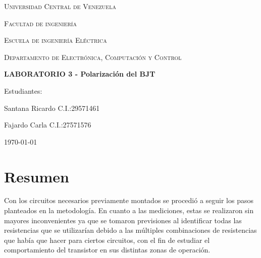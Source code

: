 \documentclass[10pt, a4paper]{article}
\begin{document}
    \begin{titlepage}
        \centering
        {\scshape\Large Universidad Central de Venezuela \par}
        {\scshape\Large Facultad de ingenier\'ia \par}
        {\scshape\Large Escuela de ingenier\'ia El\'ectrica \par}
        {\scshape\Large Departamento de Electr\'onica, Computaci\'on y Control \par}

        \vspace{6cm}
        {\Large\bfseries LABORATORIO 3 - Polarización del BJT\par}
        \vspace{5cm}

        \vfill
        \begin{flushright}
            Estudiantes:\par
            Santana Ricardo C.I.:29571461 \par
            Fajardo Carla C.I.:27571576
            \vspace{1cm}  
        \end{flushright}
        \vfill
        {\large \today \par}
    \end{titlepage}

    \tableofcontents

    \newpage

    \section{Resumen}

    Con los circuitos necesarios previamente montados se procedió a seguir los pasos planteados en la metodología. En cuanto a las mediciones, estas se realizaron sin mayores inconvenientes ya que se tomaron previsiones al identificar todas las resistencias que se utilizarían debido a las múltiples combinaciones de resistencias que había que hacer para ciertos circuitos, con el fin de estudiar el comportamiento del transistor en sus distintas zonas de operación.

    \newpage
\end{document}
